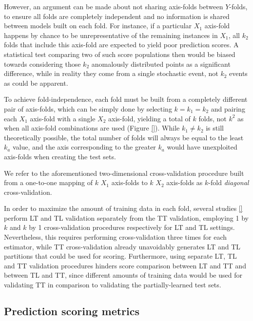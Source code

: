 However, an argument can be made about not sharing axis-folds between $Y$-folds, to ensure all folds are completely independent and no information is shared between models built on each fold. For instance, if a particular $X_1$ axis-fold happens by chance to be unrepresentative of the remaining instances in $X_1$, all $k_2$ folds that include this axis-fold are expected to yield poor prediction scores. A statistical test comparing two of such score populations then would be biased towards considering those $k_2$ anomalously distributed points as a significant difference, while in reality they come from a single stochastic event, not $k_2$ events as could be apparent.

To achieve fold-independence, each fold must be built from a completely different pair of axis-folds, which can be simply done by selecting $k=k_1=k_2$ and pairing each $X_1$ axis-fold with a single $X_2$ axis-fold, yielding a total of $k$ folds, not $k^2$ as when all axis-fold combinations are used (Figure \ref{}). While $k_1\neq k_2$ is still theoretically possible, the total number of folds will always be equal to the least $k_a$ value, and the axis corresponding to the greater $k_a$ would have unexploited axis-folds when creating the test sets.

We refer to the aforementioned two-dimensional cross-validation procedure built from a one-to-one mapping of $k$ $X_1$ axis-folds to $k$ $X_2$ axis-folds as $k$-fold \emph{diagonal} cross-validation.


In order to maximize the amount of training data in each fold, several studies \ref{} perform LT and TL validation separately from the TT validation, employing 1 by $k$ and $k$ by 1 cross-validation procedures respectively for LT and TL settings. Nevertheless, this requires performing cross-validation three times for each estimator, while TT cross-validation already unavoidably generates LT and TL partitions that could be used for scoring. Furthermore, using separate LT, TL and TT validation procedures hinders score comparison between LT and TT and between TL and TT, since different amounts of training data would be used for validating TT in comparison to validating the partially-learned test sets.


\subsection{Prediction scoring metrics}
\label{sec:prediction_metrics}

